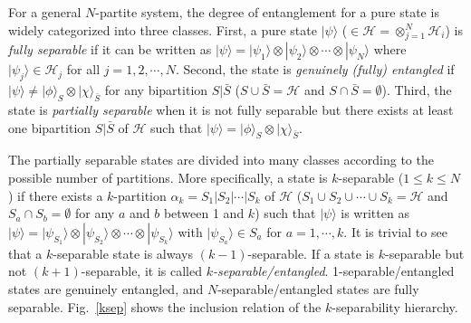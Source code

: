 \documentclass[a4paper,twocolumn,8pt,accepted=2021-12-15]{quantumarticle}
\newcommand{\nn}{\nonumber}
\def\a{\alpha}
\def\p{\psi}
\def\>{\rangle}
\def\mH{{\mathcal{H}}}
\begin{document}
	For a general $N$-partite system, the degree of entanglement for a pure state is widely categorized into three classes. First, a pure state $|\p\>$ ($\in \mH = \otimes_{j=1}^N \mH_i$) is \emph{fully separable} if it can be written as $|\p\> = |\p_1\>\otimes |\p_2\>\otimes \cdots \otimes |\p_N\>$ where $|\p_j\>\in \mathcal{H}_j$ for all $j=1,2,\cdots ,N$. Second, the state is \emph{genuinely (fully) entangled} if 
	$|\p\> \neq |\phi\>_{S}\otimes|\chi\>_{\bar{S}}$ for any bipartition $S|\bar{S}$ ($S\cup\bar{S}=\mH $  and $S\cap \bar{S}= \emptyset$). Third, the state is \emph{partially separable} when it is not fully separable but there exists at least one bipartition $S|\bar{S}$ of $\mH$ such that $|\p\> = |\phi\>_{S}\otimes|\chi\>_{\bar{S}}$.
	
	The partially separable states are divided into many classes according to the possible number of partitions. More specifically, a state is $k$-separable ($1\le k \le N$) if there exists a $k$-partition $\a_k =S_1|S_2|\cdots| S_k$ of $\mH$ ($S_1\cup S_2\cup \cdots \cup S_k=\mH $  and $S_a\cap S_b= \emptyset$ for any  $a$ and $b$ between 1 and $k$) such that $|\p\>$ is written as 
	$|\p\> = |\p_{S_1}\>\otimes |\p_{S_2}\>\otimes \cdots\otimes |\p_{S_k}\>$
	with $|\p_{S_a}\>\in S_{a}$ for $a=1,\cdots, k$. It is trivial to see that a $k$-separable state is always $(k-1)$-separable. If a state is $k$-separable but not $(k+1)$-separable, it is called \emph{$k$-separable/entangled}. 1-separable/entangled states are genuinely entangled, and $N$-separable/entangled states are fully separable. Fig.~\ref{ksep} shows the inclusion relation of the $k$-separability hierarchy.    
	
\end{document}
